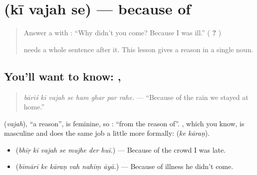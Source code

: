 \section[\texorpdfstring{\hi{की} \hi{वजह} \hi{से} (kī vajah se)}{की वजह से (kī vajah se)}]{   (kī vajah se) — because of}

\label{lesson:HI-C280-kivajahse}



\begin{quote}
Answer a \textbf{} with \textbf{}: \textquotedblleft{}Why didn't you come? Because I was ill.\textquotedblright{} (\textbf{   ?    })

\textbf{} needs a whole sentence after it. This lesson gives a reason in a single noun.
\end{quote}

\subsection*{You'll want to know:   ,  }
\begin{quote}
\textbf{       }
\end{quote}

\begin{quote}
\emph{bāriś kī vajah se ham ghar par rahe.} — \textquotedblleft{}Because of the rain we stayed at home.\textquotedblright{}
\end{quote}

\textbf{} (\emph{vajah}), \textquotedblleft{}a reason\textquotedblright{}, is feminine, so \textbf{  }: \textquotedblleft{}from the reason of\textquotedblright{}. \textbf{}, which you know, is masculine and does the same job a little more formally: \textbf{ } (\emph{ke kāraṇ}).

\begin{itemize}
\raggedright
  \item \textbf{      } (\emph{bhīṛ kī vajah se mujhe der huī.}) — Because of the crowd I was late.
  \item \textbf{     } (\emph{bīmārī ke kāraṇ vah nahīṃ āyā.}) — Because of illness he didn't come.
\end{itemize}

